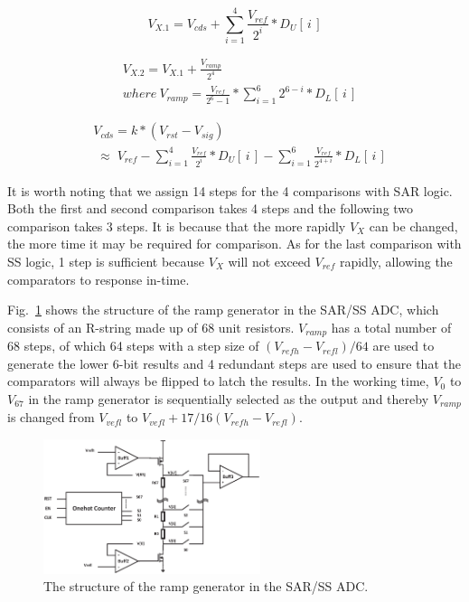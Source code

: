 \begin{equation}
	V_{X.1}=V_{cds}+\sum_{i=1}^{4} {\frac{V_{ref}}{2^{i}}\ast{D_{U}\left[\,i\,\right]}}
	\label{eq4}
\end{equation}

\begin{equation}
	\begin{aligned}
		&V_{X.2}=V_{X.1}+\frac{V_{ramp}}{2^4}\\ &where\  V_{ramp}=\frac{V_{ref}}{2^6-1}\ast\sum_{i=1}^{6}2^{6-i}\ast{D_{L}\left[\,i\,\right]}
		\label{eq5}
	\end{aligned}	
\end{equation}

\begin{equation}
	\begin{aligned}
		&V_{cds}=k\ast(V_{rst}-V_{sig})\\
		&\;{\approx}\;{V_{ref}-\sum_{i=1}^{4} \frac{V_{ref}}{2^{i}}\ast{D_{U}\left[\,i\,\right]}-\sum_{i=1}^{6} \frac{V_{ref}}{2^{4+i}}\ast{D_{L}\left[\,i\,\right]}}
		\label{eq6}
	\end{aligned}
\end{equation}

It is worth noting that we assign 14 steps for the 4 comparisons with SAR logic. Both the first and second comparison takes 4 steps and the following two comparison takes 3 steps. It is because that the more rapidly $V_{X}$ can be changed, the more time it may be required for comparison. As for the last comparison with SS logic, 1 step is sufficient because $V_{X}$ will not exceed $V_{ref}$ rapidly, allowing the comparators to response in-time.

Fig.~\ref{RRAMP} shows the structure of the ramp generator in the SAR/SS ADC, which consists of an R-string made up of 68 unit resistors. $V_{ramp}$ has a total number of 68 steps,
of which 64 steps with a step size of $(V_{refh}-V_{refl})/64$ are used to generate the lower 6-bit results and 4 redundant steps are used to ensure that the comparators 
will always be flipped to latch the results. In the working time, $V_{0}$ to $V_{67}$ in the ramp generator is sequentially selected as the output and thereby 
$V_{ramp}$ is changed from $V_{vefl}$ to $V_{vefl}+17/16(V_{refh}-V_{refl})$.

\begin{figure}[htbp] 
	\centerline{\includegraphics[width=2.5in]{./Figures/RRAMP.eps}}
	\caption{The structure of the ramp generator in the SAR/SS ADC.}
	\label{RRAMP}
\end{figure}

